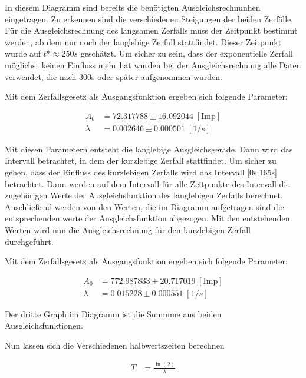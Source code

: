 \noindent In diesem Diagramm sind bereits die benötigten Ausgleichsrechnunhen eingetragen.
Zu erkennen sind die verschiedenen Steigungen der beiden Zerfälle.
Für die Ausgleichsrechnung des langsamen Zerfalls muss der Zeitpunkt bestimmt werden, ab dem nur noch der langlebige Zerfall stattfindet.
Dieser Zeitpunkt wurde auf $t* \approx 250s$ geschätzt.
Um sicher zu sein, dass der exponentielle Zerfall möglichst keinen Einfluss mehr hat wurden bei der Ausgleichsrechnung alle Daten verwendet, die nach 300s oder später aufgenommen wurden.

\noindent Mit dem Zerfallsgesetz als Ausgangsfunktion ergeben sich folgende Parameter:

\begin{align}
    A_0 &= 72.317788 \pm 16.092044 \; [\text{Imp}] \nonumber  \\
    \lambda &= 0.002646 \pm 0.000501 \; [1/s] \nonumber
\end{align}
    


\noindent Mit diesen Parametern entsteht die langlebige Ausgleichsgerade. 
Dann wird das Intervall betrachtet, in dem der kurzlebige Zerfall stattfindet. 
Um sicher zu gehen, dass der Einfluss des kurzlebigen Zerfalls wird das Intervall [0s;165s] betrachtet.
Dann werden auf dem Intervall für alle Zeitpunkte des Intervall die zugehörigen Werte der Ausgleichsfunktion des langlebigen Zerfalls berechnet.
Anschließend werden von den Werten, die im Diagramm aufgetragen sind die entsprechenden werte der Ausgleichsfunktion abgezogen.
Mit den entstehenden Werten wird nun die Ausgleichsrechnung für den kurzlebigen Zerfall durchgeführt. 

\noindent Mit dem Zerfallsgesetz als Ausgangsfunktion ergeben sich folgende Parameter:

\begin{align}
    A_0 &= 772.987833 \pm 20.717019 \; [\text{Imp}] \nonumber  \\
    \lambda &= 0.015228 \pm 0.000551 \; [1/s] \nonumber
\end{align}

\noindent Der dritte Graph im Diagramm ist die Summme aus beiden Ausgleichsfunktionen.

\noindent Nun lassen sich die Verschiedenen halbwertszeiten berechnen

\begin{align}
    T &= \frac{\ln(2)}{\lambda} \nonumber
\end{align}

